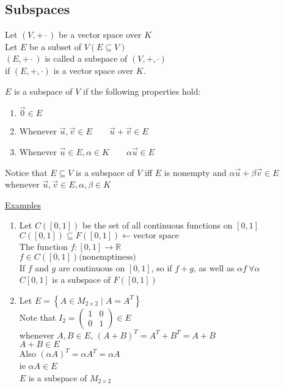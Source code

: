 \documentclass[12pt]{article}
\renewcommand{\v}[1]{\overrightarrow{#1}}
\newcommand\mm[1]{\begin{pmatrix}#1\end{pmatrix}}
\newcommand{\real}[0]{\mathbb{R}}
\newenvironment{examples}{\underline{Examples}\begin{enumerate}}{\end{enumerate}}
\newcommand{\bb}[1]{\left\{#1\right\}}
\begin{document}

\subsection{Subspaces}

Let $(V, + \cdot)$ be a vector space over $K$ \\
Let $E$ be a subset of $V (E \subseteq V)$ \\
$(E, + \cdot)$ is called a subspace of $(V, +, \cdot)$ \\
if $(E, +, \cdot)$ is a vector space over $K$.
	

$E$ is a subspace of $V$ if the following properties hold:

\begin{enumerate}
	\item $\v{0} \in E$ 
	\item Whenever $\v{u}, \v{v} \in E \qquad \v{u} + \v{v} \in E$
	\item Whenever $\v{u} \in E, \alpha \in K \qquad \alpha \v{u} \in E$
\end{enumerate}


Notice that $E \subseteq V$ is a subspace of $V$ iff $E$ is nonempty and $\alpha \v{u} + \beta \v{v} \in E$ whenever $\v{u}, \v{v} \in E, \alpha, \beta \in K$

\begin{examples}
	\item Let $C([0, 1])$ be the set of all continuous functions on $[0, 1]$ \\
	$C([0, 1]) \subseteq F([0, 1])  \leftarrow \text{vector space}$ \\
	The function $f: [0, 1] \rightarrow \real$ \\
	$f \in C([0, 1]) \text{(nonemptiness)}$ \\
	If $f$ and $g$ are continuous on $[0, 1]$, so if $f + g$, as well as $\alpha f \ \forall \alpha$ \\
	$C[0, 1]$ is a subspace of $F([0, 1])$
	
	\item Let $E = \bb{A \in M_{2 \times 2} \mid A = A^T}$ \\
	Note that $I_2 = \mm{1 & 0 \\ 0 & 1} \in E$ \\
	whenever $A, B \in E$, $(A + B)^T = A^T + B^T = A + B$ \\
	$A + B \in E$ \\
	Also $(\alpha A)^T = \alpha A^T = \alpha A$ \\
	ie $\alpha A \in E$ \\
	$E$ is a subspace of $M_{2 \times 2}$
\end{examples}
\end{document}

